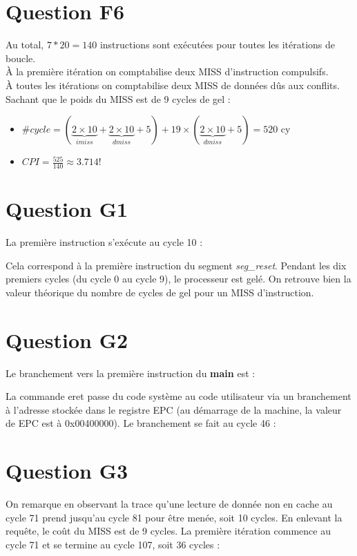 \documentclass[10pt]{article}
\begin{document}
\section{Question F6}
Au total, $7*20=140$ instructions sont exécutées pour toutes les itérations de
boucle.\\
À la première itération on comptabilise deux MISS d'instruction compulsifs.\\
À toutes les itérations on comptabilise deux MISS de données dûs aux conflits.\\
Sachant que le poids du MISS est de 9 cycles de gel :
\begin{itemize}
  \item $\#cycle=(\underbrace{2\times{10}}_{imiss}+
    \underbrace{2\times{10}}_{dmiss}+5)+
    {19}\times(\underbrace{2\times{10}}_{dmiss}+5)=520$ cy
  \item ${CPI}=\frac{525}{140}\approx{3.714}$!
\end{itemize}

\newpage

\section{Question G1}
La première instruction s'exécute au cycle 10 :

Cela correspond à la première instruction du segment {\it seg\_reset}. Pendant
les dix premiers cycles (du cycle 0 au cycle 9), le processeur est gelé. On
retrouve bien la valeur théorique du nombre de cycles de gel pour un MISS
d'instruction.

\section{Question G2}
Le branchement vers la première instruction du {\bf main} est :

La commande eret passe du code système au code utilisateur via un branchement
à l'adresse stockée dans le registre EPC (au démarrage de la machine, la valeur
de EPC est à 0x00400000). Le branchement se fait au cycle 46 :


\newpage

\section{Question G3}
On remarque en observant la trace qu'une lecture de donnée non en cache au
cycle 71 prend jusqu'au cycle 81 pour être menée, soit 10 cycles. En enlevant
la requête, le coût du MISS est de 9 cycles.
La première itération commence au cycle 71 et se termine au cycle 107, soit
36 cycles :


\newpage
\end{document}
